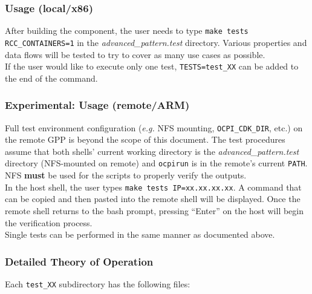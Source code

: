 \documentclass{article}
\begin{document}
\subsubsection*{Usage (local/x86)}
After building the component, the user needs to type \verb+make tests RCC_CONTAINERS=1+ in the \textit{advanced\_pattern.test} directory. Various properties and data flows will be tested to try to cover as many use cases as possible. \\

If the user would like to execute only one test, \verb+TESTS=test_XX+ can be added to the end of the command.
\subsubsection*{\textbf{Experimental}: Usage (remote/ARM)}
Full test environment configuration (\textit{e.g.} NFS mounting, \verb+OCPI_CDK_DIR+, etc.) on the remote GPP is beyond the scope of this document. The test procedures assume that both shells' current working directory is the \textit{advanced\_pattern.test} directory (NFS-mounted on remote) and \verb+ocpirun+ is in the remote's current \verb+PATH+. NFS \textbf{must} be used for the scripts to properly verify the outputs. \\

In the host shell, the user types \verb+make tests IP=xx.xx.xx.xx+. A command that can be copied and then pasted into the remote shell will be displayed. Once the remote shell returns to the bash prompt, pressing ``Enter'' on the host will begin the verification process. \\

Single tests can be performed in the same manner as documented above.

\subsubsection*{Detailed Theory of Operation}
Each \verb+test_XX+ subdirectory has the following files:
\end{document}
